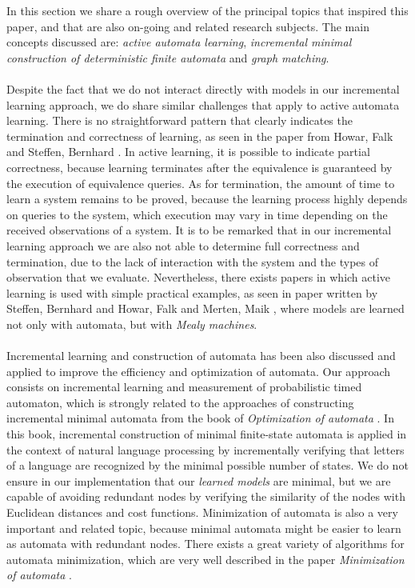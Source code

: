 In this section we share a rough overview of the principal topics that inspired this paper, and that are also on-going and related research subjects. The main concepts discussed are: \textit{active automata learning}, \textit{incremental minimal construction of deterministic finite automata} and \textit{graph matching}. \\ \\
%
Despite the fact that we do not interact directly with models in our incremental learning approach, we do share similar challenges that apply to active automata learning. There is no straightforward pattern that clearly indicates the termination and correctness of learning, as seen in the paper from Howar, Falk and Steffen, Bernhard \cite{activeLearning}. In active learning, it is possible to indicate partial correctness, because learning terminates after the equivalence is guaranteed by the execution of equivalence queries. As for termination, the amount of time to learn a system remains to be proved, because the learning process highly depends on queries to the system, which execution may vary in time depending on the received observations of a system. It is to be remarked that in our incremental learning approach we are also not able to determine full correctness and termination, due to the lack of interaction with the system and the types of observation that we evaluate. Nevertheless, there exists papers in which active learning is used with simple practical examples, as seen in paper written by Steffen, Bernhard and Howar, Falk and Merten, Maik \cite{activeAtuomata}, where models are learned not only with automata, but with \textit{Mealy machines}.\\ \\
%
Incremental learning and construction of automata has been also discussed and applied to improve the efficiency and optimization of automata.
%
Our approach consists on incremental learning and measurement of probabilistic timed automaton, which is strongly related to the approaches of constructing incremental minimal automata from the book of \textit{Optimization of automata } \cite{optimizationOfAutomata}. In this book, incremental construction of minimal finite-state automata is applied in the context of natural language processing by incrementally verifying that letters of a language are recognized by the minimal possible number of states. We do not ensure in our implementation that our \textit{learned models} are minimal, but we are capable of avoiding redundant nodes by verifying the similarity of the nodes with Euclidean distances and cost functions. Minimization of automata is also a very important and related topic, because minimal automata might be easier to learn as automata with redundant nodes. There exists a great variety of algorithms for automata minimization, which are very well described in the paper \textit{Minimization of automata} \cite{minimizationOfautomata}. \\ \\
